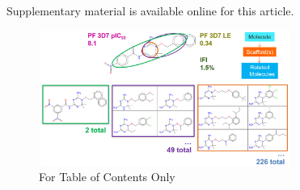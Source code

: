 \documentclass[journal=jacsat,biochem,manuscript=article]{achemso}
\begin{document}
\begin{suppinfo}
Supplementary material is available online for this article.
\end{suppinfo}


\newpage
\begin{figure}
  \includegraphics[width=3.25in,height=1.75in]{fig/TOC_image_v4.png}
  \caption{For Table of Contents Only}
\end{figure}
\end{document}
